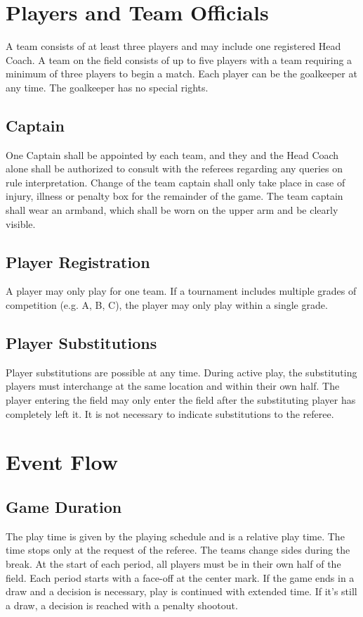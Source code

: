 \section{Players and Team Officials}
A team consists of at least three players and may include one registered Head Coach.
A team on the field consists of up to five players with a team requiring a minimum of three players to begin a match.
Each player can be the goalkeeper at any time.
The goalkeeper has no special rights.

\subsection{Captain}
One Captain shall be appointed by each team, and they and the Head Coach alone shall be authorized to consult with the referees regarding any queries on rule interpretation.
Change of the team captain shall only take place in case of injury, illness or penalty box for the remainder of the game.
The team captain shall wear an armband, which shall be worn on the upper arm and be clearly visible.

\subsection{Player Registration}
A player may only play for one team.
If a tournament includes multiple grades of competition (e.g. A, B, C), the player may only play within a single grade.

\subsection{Player Substitutions}
Player substitutions are possible at any time.
During active play, the substituting players must interchange at the same location and within their own half.
The player entering the field may only enter the field after the substituting player has completely left it.
It is not necessary to indicate substitutions to the referee.

\section{Event Flow}
\subsection{Game Duration}
The play time is given by the playing schedule and is a relative play time.
The time stops only at the request of the referee.
The teams change sides during the break.
At the start of each period, all players must be in their own half of the field.
Each period starts with a face-off at the center mark.
If the game ends in a draw and a decision is necessary, play is continued with extended time.
If it's still a draw, a decision is reached with a penalty shootout.

